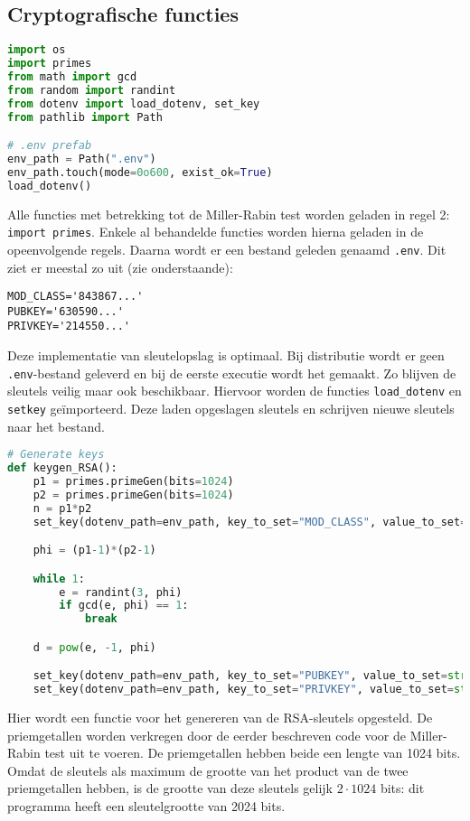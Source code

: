 \documentclass{report} %
\let\code\lstinline
\begin{document}
\subsection{Cryptografische functies}\label{Crypt_Functions}
\begin{lstlisting}[language=Python]
import os
import primes
from math import gcd
from random import randint
from dotenv import load_dotenv, set_key
from pathlib import Path

# .env prefab
env_path = Path(".env")
env_path.touch(mode=0o600, exist_ok=True)
load_dotenv()
\end{lstlisting}
Alle functies met betrekking tot de Miller-Rabin test worden geladen in regel 2: \code{import primes}. Enkele al behandelde functies worden hierna geladen in de opeenvolgende regels. Daarna wordt er een bestand geleden genaamd \code{.env}. Dit ziet er meestal zo uit (zie onderstaande):\\
\begin{lstlisting}
MOD_CLASS='843867...'
PUBKEY='630590...'
PRIVKEY='214550...'
\end{lstlisting}
Deze implementatie van sleutelopslag is optimaal. Bij distributie wordt er geen \code{.env}-bestand geleverd en bij de eerste executie wordt het gemaakt. Zo blijven de sleutels veilig maar ook beschikbaar. Hiervoor worden de functies \code{load_dotenv} en \code{setkey} geïmporteerd. Deze laden opgeslagen sleutels en schrijven nieuwe sleutels naar het bestand.

\begin{lstlisting}[language=Python, firstnumber=31]
# Generate keys
def keygen_RSA():
    p1 = primes.primeGen(bits=1024)
    p2 = primes.primeGen(bits=1024)
    n = p1*p2
    set_key(dotenv_path=env_path, key_to_set="MOD_CLASS", value_to_set=str(n))

    phi = (p1-1)*(p2-1)

    while 1:
        e = randint(3, phi)
        if gcd(e, phi) == 1:
            break

    d = pow(e, -1, phi)

    set_key(dotenv_path=env_path, key_to_set="PUBKEY", value_to_set=str(e))
    set_key(dotenv_path=env_path, key_to_set="PRIVKEY", value_to_set=str(d))
\end{lstlisting}
Hier wordt een functie voor het genereren van de RSA-sleutels opgesteld. De priemgetallen worden verkregen door de eerder beschreven code voor de Miller-Rabin test uit te voeren. De priemgetallen hebben beide een lengte van 1024 bits. Omdat de sleutels als maximum de grootte van het product van de twee priemgetallen hebben, is de grootte van deze sleutels gelijk $2\cdot1024$ bits: dit programma heeft een sleutelgrootte van 2024 bits.\\
\end{document}
